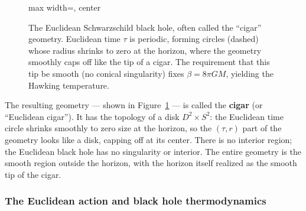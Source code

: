 \documentclass[11pt,letterpaper]{article}
\theoremstyle{plain}
\theoremstyle{definition}
\theoremstyle{remark}
\begin{document}
\begin{figure}[t]
\centering
\begin{adjustbox}{max width=\textwidth, center}
\end{adjustbox}
\caption{The Euclidean Schwarzschild black hole, often called the ``cigar''
geometry.  Euclidean time $\tau$ is periodic, forming circles (dashed) whose
radius shrinks to zero at the horizon, where the geometry smoothly caps off like
the tip of a cigar.  The requirement that this tip be smooth (no conical
singularity) fixes $\beta = 8\pi GM$, yielding the Hawking
temperature.}\label{fig05:cigar}
\end{figure}

The resulting geometry --- shown in Figure~\ref{fig05:cigar} --- is called the
\textbf{cigar} (or ``Euclidean cigar'').  It has the topology of a disk
$D^2 \times S^2$: the Euclidean time circle shrinks smoothly to zero size at the
horizon, so the $(\tau, r)$ part of the geometry looks like a disk, capping off
at its center.  There is no interior region; the Euclidean black hole has no
singularity or interior.  The entire geometry is the smooth region outside the
horizon, with the horizon itself realized as the smooth tip of the cigar.

\subsubsection*{The Euclidean action and black hole thermodynamics}
\end{document}
